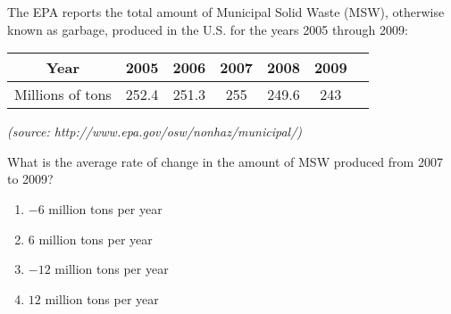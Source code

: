 \bigskip

\item The EPA reports the total amount of Municipal Solid Waste (MSW), otherwise known as garbage, produced in the U.S. for the years 2005 through 2009:

\begin{center}
\begin{tabular}{|c|c|c|c|c|c|c|}
\hline
Year & 2005&2006&2007&2008&2009\\
\hline
Millions of tons & 252.4 & 251.3 & 255 & 249.6 & 243\\
\hline
\end{tabular}
\end{center}

{\it (source: http://www.epa.gov/osw/nonhaz/municipal/)}

\bigskip

What is the average rate of change in the amount of MSW produced from 2007 to 2009?

\begin{enumerate}
\item $-6$ million tons per year
\item $6$ million tons per year
\item $-12$ million tons per year
\item $12$ million tons per year
\end{enumerate}

